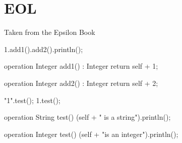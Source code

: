 \chapter{EOL}

Taken from the Epsilon Book

\begin{eol}
1.add1().add2().println();

operation Integer add1() : Integer {
    return self + 1;
}

operation Integer add2() : Integer {
    return self + 2;
}
\end{eol}

\begin{eol}
"1".test();
1.test();

operation String test() {
    (self + " is a string").println();
}

operation Integer test() {
    (self + "is an integer").println();
}
\end{eol}

